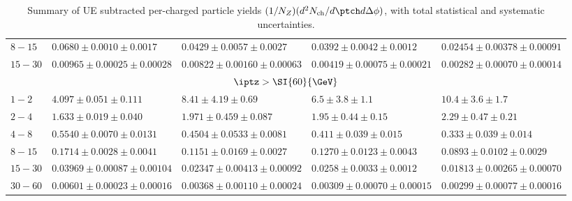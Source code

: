 \begin{table}[!ht]
\begin{center}
\begin{tabular}{|l|l|l|l|l|}
\footnotesize {$8 - 15$} & \scriptsize {$0.0680 \pm 0.0010 \pm 0.0017$}  & \scriptsize {$0.0429 \pm 0.0057 \pm 0.0027$}  & \scriptsize {$0.0392 \pm 0.0042 \pm 0.0012$}  & \scriptsize {$0.02454 \pm 0.00378 \pm 0.00091$}  \\
\footnotesize {$15 - 30$} & \scriptsize {$0.00965 \pm 0.00025 \pm 0.00028$}  & \scriptsize {$0.00822 \pm 0.00160 \pm 0.00063$}  & \scriptsize {$0.00419 \pm 0.00075 \pm 0.00021$}  & \scriptsize {$0.00282 \pm 0.00070 \pm 0.00014$}  \\
\hline \hline
\multicolumn{5}{|c|}{\small {$\iptz > \SI{60}{\GeV}$}} \\ \hline
\footnotesize {$1 - 2$} & \scriptsize {$4.097 \pm 0.051 \pm 0.111$}  & \scriptsize {$8.41 \pm 4.19 \pm 0.69$}  & \scriptsize {$6.5 \pm 3.8 \pm 1.1$}  & \scriptsize {$10.4 \pm 3.6 \pm 1.7$}  \\
\footnotesize {$2 - 4$} & \scriptsize {$1.633 \pm 0.019 \pm 0.040$}  & \scriptsize {$1.971 \pm 0.459 \pm 0.087$}  & \scriptsize {$1.95 \pm 0.44 \pm 0.15$}  & \scriptsize {$2.29 \pm 0.47 \pm 0.21$}  \\
\footnotesize {$4 - 8$} & \scriptsize {$0.5540 \pm 0.0070 \pm 0.0131$}  & \scriptsize {$0.4504 \pm 0.0533 \pm 0.0081$}  & \scriptsize {$0.411 \pm 0.039 \pm 0.015$}  & \scriptsize {$0.333 \pm 0.039 \pm 0.014$}  \\
\footnotesize {$8 - 15$} & \scriptsize {$0.1714 \pm 0.0028 \pm 0.0041$}  & \scriptsize {$0.1151 \pm 0.0169 \pm 0.0027$}  & \scriptsize {$0.1270 \pm 0.0123 \pm 0.0043$}  & \scriptsize {$0.0893 \pm 0.0102 \pm 0.0029$}  \\
\footnotesize {$15 - 30$} & \scriptsize {$0.03969 \pm 0.00087 \pm 0.00104$}  & \scriptsize {$0.02347 \pm 0.00413 \pm 0.00092$}  & \scriptsize {$0.0258 \pm 0.0033 \pm 0.0012$}  & \scriptsize {$0.01813 \pm 0.00265 \pm 0.00070$}  \\
\footnotesize {$30 - 60$} & \scriptsize {$0.00601 \pm 0.00023 \pm 0.00016$}  & \scriptsize {$0.00368 \pm 0.00110 \pm 0.00024$}  & \scriptsize {$0.00309 \pm 0.00070 \pm 0.00015$}  & \scriptsize {$0.00299 \pm 0.00077 \pm 0.00016$}  \\
\hline
\end{tabular}
\caption{Summary of UE subtracted per-\Zboson charged particle yields $(1/N_Z)(d^2N_\mathrm{ch}/d\ptch d\Delta\phi)$, with total statistical and systematic uncertainties.}
\label{tab1}
\end{center}
\end{table}
